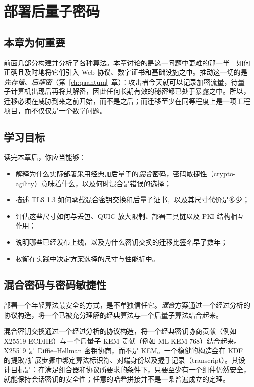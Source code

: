 \chapter{部署后量子密码}
\label{ch:applications}

\section{本章为何重要}
前面几部分构建并分析了各种算法。本章讨论的是这一问题中更难的那一半：如何正确且及时地将它们引入 Web 协议、数字证书和基础设施之中。推动这一切的是\emph{先存储、后解密}（第~\ref{ch:quantum}~章）：攻击者今天就可以记录加密流量，待量子计算机出现后再将其解密，因此任何长期有效的秘密都已处于暴露之中。所以，迁移必须在威胁到来之前开始，而不是之后；而迁移至少在同等程度上是一项工程项目，而不仅仅是一个数学问题。

\section{学习目标}
读完本章后，你应当能够：

\begin{itemize}
  \item 解释为什么实际部署采用经典加后量子的\emph{混合}密码，密码敏捷性（crypto-agility）意味着什么，以及何时混合是错误的选择；
  \item 描述 TLS 1.3 如何承载混合密钥交换和后量子证书，以及其尺寸代价是多少；
  \item 评估这些尺寸如何与丢包、QUIC 放大限制、部署工具链以及 PKI 结构相互作用；
  \item 说明哪些已经发布上线，以及为什么密钥交换的迁移比签名早了数年；
  \item 权衡在实践中决定方案选择的尺寸与性能折中。
\end{itemize}

\section{混合密码与密码敏捷性}
部署一个年轻算法最安全的方式，是不单独信任它。\emph{混合}方案通过一个经过分析的协议构造，将一个已被充分理解的经典算法与一个后量子算法结合起来。

\begin{definition}[混合密钥交换]
混合密钥交换通过一个经过分析的协议构造，将一个经典密钥协商贡献（例如
X25519 ECDHE）与一个后量子 KEM 贡献（例如 ML-KEM-768）结合起来。X25519 是
Diffie--Hellman 密钥协商，而不是 KEM。一个稳健的构造会在 KDF 的提取/扩展步骤中绑定算法标识符、对端身份以及握手记录（transcript）。其设计目标是：在满足组合器和协议所要求的条件下，只要至少有一个组件仍然安全，就能保持会话密钥的安全性；任意的哈希拼接并不是一条普遍成立的定理。
\end{definition}

